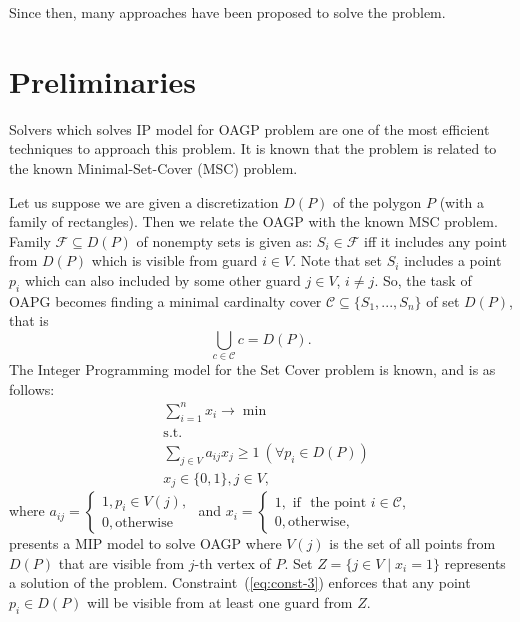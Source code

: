 \documentclass[runningheads,a4paper]{llncs}
\begin{document}
     Since then, many approaches have been proposed to solve the problem.
     \section{Preliminaries}
     Solvers which solves IP model for OAGP problem are one of the most efficient techniques to approach this problem. It is known that the problem is related to the known Minimal-Set-Cover (MSC) problem. 

     Let us suppose we are given a discretization $D(P)$ of the polygon $P$ (with a family of rectangles). Then we relate the OAGP with the known MSC problem.  
     Family $\mathcal{F}\subseteq D(P)$ of nonempty sets is given as: $S_i \in \mathcal{F}$ iff it includes any point from $D(P)$ which is visible from guard $i\in V$. Note that set $S_i$ includes a point $p_i$ which can also included by some other guard $j\in V$, $i \neq j$. So, the task of OAPG becomes finding a minimal cardinalty cover $\mathcal{C}\subseteq\{S_1,...,S_n\}$ of set $D(P)$, that is 
     $$ \bigcup_{c \in \mathcal{C}} c = D(P).$$ The Integer Programming model for the Set Cover problem is known, and is as follows: 
     \begin{align}
        &\sum_{i=1}^n x_i \longrightarrow \min \\
        &\mbox{s.t.} \\
        &\sum_{j\in V} a_{ij}x_j \geq 1\ (\forall p_i\in D(P)) \label{eq:const-3}\\
        & x_j \in \{0,1\}, j \in V,
     \end{align}
     where 
     $a_{ij} = \begin{cases}
          1, p_i \in V(j), \\
          0, \mbox{otherwise} 
     \end{cases}$ 
     and $x_i = \begin{cases}
     	 1, \mbox{ if } \mbox{ the point } i \in \mathcal{C},\\
     	 0, \mbox{otherwise},
     \end{cases}$ \\
      presents a MIP model to solve OAGP where $V(j)$ is the set of all points from $D(P)$ that are visible from $j$-th vertex of $P$.
     Set $Z = \{j \in V\mid x_i=1\}$ represents a solution of the problem. 
     Constraint~(\ref{eq:const-3}) enforces that any point $p_i \in D(P)$ will be visible from at least one guard from $Z$.
     
\end{document}

